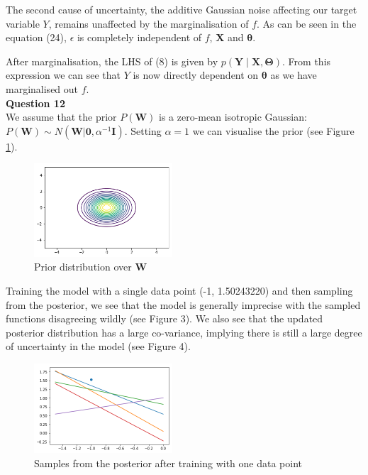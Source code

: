\documentclass[10pt, a4paper, twocolumn]{article} %
\begin{document}
\begin{enumerate}
  The second cause of uncertainty, the additive Gaussian noise affecting our target variable $Y$, remains unaffected by the marginalisation of $f$. As can be seen in the equation (24), $\epsilon$ is completely independent of $f$, $\mathbf{X}$ and $\mathbf{\theta}$.
  
  After marginalisation, the LHS of (8) is given by $p(\mathbf{Y}\mid \mathbf{X},\mathbf{\Theta})$. From this expression we can see that $Y$ is now directly dependent on $\mathbf{\theta}$ as we have marginalised out $f$.\\
      
 \textbf{Question 12}\\
 We assume that the prior $P(\mathbf{W})$ is a zero-mean isotropic Gaussian:  $P(\mathbf{W})\sim N(\mathbf{W}|\mathbf{0},\alpha^{-1}\mathbf{I})$. Setting $\alpha = 1$ we can visualise the prior (see Figure \ref{fig:Q12_Prior_1}).
      
\begin{figure}[]
      \centering
      \includegraphics[width = 0.46\textwidth]{imagesfinal/finalpriorQ12.png}
      \caption{Prior distribution over $\mathbf{W}$}
      \label{fig:Q12_Prior_1}
  \end{figure}
      

Training the model with a single data point (-1, 1.50243220) and then sampling from the posterior, we see that the model is generally imprecise with the sampled functions disagreeing wildly (see Figure 3). We also see that the updated posterior distribution has a large co-variance, implying there is still a large degree of uncertainty in the model (see Figure 4).
  
\begin{figure}[]
      \centering
      \captionsetup{justification=centering, margin = 1cm}
      \includegraphics[width = 0.46\textwidth]{imagesfinal/Q12_finalposterior_1_.png}
      \caption{Samples from the posterior after training with one data point}
      \label{fig:Q12_posterior_1}
  \end{figure}
  

\end{enumerate}
\end{document}
